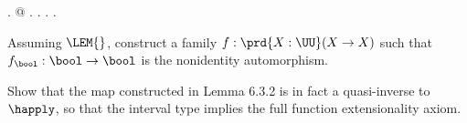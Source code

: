 \begin{coqdoccode}
\coqdocindent{1.00em}
 .  \coqdocnotation{(}@ \coqdocvar{\_} \coqdocvar{\_}  \coqdocvar{\_} \coqref{Ch06 3.::'[' x ';' '..' ';' x ']'}{\coqdocnotation{[}}\coqref{Ch06 3.::'[' x ';' '..' ';' x ']'}{\coqdocnotation{]}} \coqdocnotation{)\^{}}.  .\coqdoceol
\coqdocnoindent
{}.\coqdoceol
\coqdocemptyline
\coqdocnoindent
{}\coqdocindent{0.50em}
  .\coqdoceol
\coqdocemptyline
\end{coqdoccode}
Assuming $\LEM{}$, construct a family $f : \prd{X : \UU} (X \to X)$ such that
$f_{\bool} : \bool \to \bool$ is the nonidentity automorphism.


Show that the map constructed in Lemma 6.3.2 is in fact a quasi-inverse to
$\happly$, so that the interval type implies the full function extensionality
axiom.


